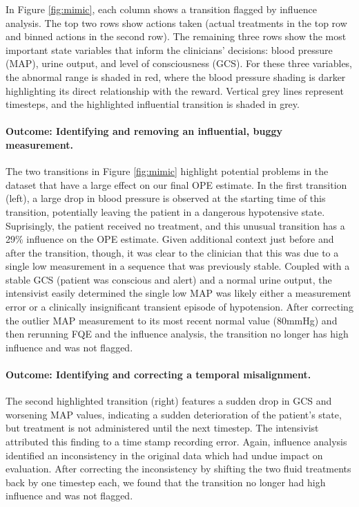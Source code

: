 \documentclass{article}
\begin{document}
In Figure \ref{fig:mimic}, each column shows a transition flagged by influence analysis. The top two rows show actions taken (actual treatments in the top row and binned actions in the second row). The remaining three rows show the most important state variables that inform the clinicians' decisions: blood pressure (MAP), urine output, and level of consciousness (GCS). For these three variables, the abnormal range is shaded in red, where the blood pressure shading is darker highlighting its direct relationship with the reward. Vertical grey lines represent timesteps, and the highlighted influential transition is shaded in grey.

\paragraph{Outcome: Identifying and removing an influential, buggy measurement.}
The two transitions in Figure \ref{fig:mimic} highlight potential problems in the dataset that have a large effect on our final OPE estimate. In the first transition (left), a large drop in blood pressure is observed at the starting time of this transition, potentially leaving the patient in a dangerous hypotensive state. Suprisingly, the patient received no treatment, and this unusual transition has a 29\% influence on the OPE estimate. Given additional context just before and after the transition, though, it was clear to the clinician that this was due to a single low measurement in a sequence that was previously stable. Coupled with a stable GCS (patient was conscious and alert) and a normal urine output, the intensivist easily determined the single low MAP was likely either a measurement error or a clinically insignificant transient episode of hypotension. After correcting the outlier MAP measurement to its most recent normal value (80mmHg) and then rerunning FQE and the influence analysis, the transition no longer has high influence and was not flagged.

\paragraph{Outcome: Identifying and correcting a temporal misalignment.}
The second highlighted transition (right) features a sudden drop in GCS and worsening MAP values, indicating a sudden deterioration of the patient's state, but treatment is not administered until the next timestep. The intensivist attributed this finding to a time stamp recording error. Again, influence analysis identified an inconsistency in the original data which had undue impact on evaluation. After correcting the inconsistency by shifting the two fluid treatments back by one timestep each, we found that the transition no longer had high influence and was not flagged.
\end{document}
